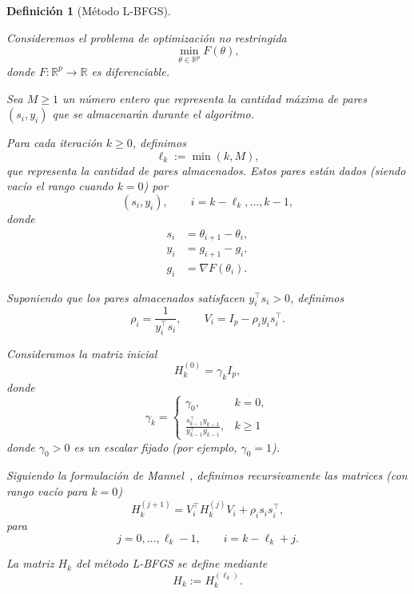 \documentclass[a4paper,openany,oneside,10pt]{report}
\theoremstyle{pnlTeorema}
\theoremstyle{pnlDefinicion}
\newtheorem{definicion}{Definición}[section]
\theoremstyle{pnlObservacion}
\begin{document}
\begin{definicion}[Método L-BFGS]
\label{def:metodo-lbfgs}

Consideremos el problema de optimización no restringida
\[
    \min_{\theta\in\mathbb{R}^p} F(\theta),
\]
donde $F:\mathbb{R}^p\to\mathbb{R}$ es diferenciable.

Sea $M\geq 1$ un número entero que representa la cantidad
máxima de pares $(s_i,y_i)$ que se almacenarán durante
el algoritmo.

Para cada iteración $k\geq 0$, definimos
\[
    \ell_k:=\min(k,M),
\]
que representa la cantidad de pares almacenados.
Estos pares están dados (siendo vacío el rango cuando $k=0$) por
\[
    (s_i,y_i),\qquad i=k-\ell_k,\ldots,k-1,
\]
donde
\[
    \begin{aligned}
        s_i&=\theta_{i+1}-\theta_i,\\
        y_i&=g_{i+1}-g_i,\\
        g_i&=\nabla F(\theta_i).
    \end{aligned}
\]

Suponiendo que los pares almacenados satisfacen
$y_i^\top s_i>0$, definimos
\[
    \rho_i=\frac{1}{y_i^\top s_i},
    \qquad
    V_i=I_p-\rho_i y_i s_i^\top.
\]

Consideramos la matriz inicial
\[
    H_k^{(0)}=\gamma_k I_p,
\]
donde
\begin{equation}
    \label{eq:lbfgs-escalado}
    \gamma_k=
    \begin{cases}
        \gamma_0, & k=0,\\[8pt]
        \displaystyle
        \frac{s_{k-1}^\top y_{k-1}}
        {y_{k-1}^\top y_{k-1}}, & k\geq 1
    \end{cases}
\end{equation}
donde $\gamma_0>0$ es un escalar fijado (por ejemplo, $\gamma_0=1$).

Siguiendo la formulación de Mannel~\cite[sección~2.1, ec.~(1)]{mannel2025}, definimos recursivamente las matrices (con rango vacío para $k=0$)
\begin{equation}
    H_k^{(j+1)}
    =V_i^\top H_k^{(j)}V_i
    +\rho_i s_i s_i^\top,
    \label{eq:recurrencia-lbfgs}
\end{equation}
para
\[
    j=0,\ldots,\ell_k-1,
    \qquad i=k-\ell_k+j.
\]

La matriz $H_k$ del método L-BFGS se define mediante
\begin{equation}
    \boxed{H_k:=H_k^{(\ell_k)}.}
    \label{eq:matriz-lbfgs}
\end{equation}


\end{definicion}
\end{document}

